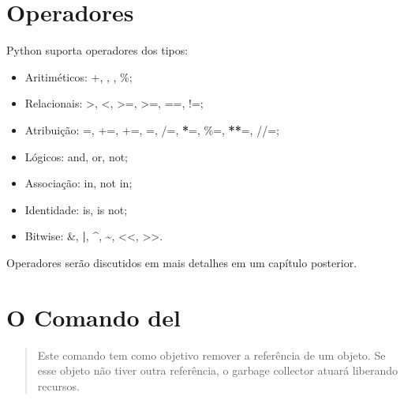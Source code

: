 \documentclass[letterpaper,10pt,brazil]{sphinxmanual}
\begin{document}
\section{Operadores}
\label{\detokenize{content/language_particularities:operadores}}
Python suporta operadores dos tipos:
\begin{itemize}
\item {} 
Aritiméticos: +, \sphinxhyphen{}, \sphinxstyleemphasis{, /, //, *}, \%;

\item {} 
Relacionais: \textgreater{}, \textless{}, \textgreater{}=, \textgreater{}=, ==, !=;

\item {} 
Atribuição: =, +=, +=, \sphinxhyphen{}=, /=, {\color{red}\bfseries{}*}=, \%=, {\color{red}\bfseries{}**}=, //=;

\item {} 
Lógicos: and, or, not;

\item {} 
Associação: in, not in;

\item {} 
Identidade: is, is not;

\item {} 
Bitwise: \&, {\color{red}\bfseries{}|}, \textasciicircum{}, \textasciitilde{}, \textless{}\textless{}, \textgreater{}\textgreater{}.

\end{itemize}

Operadores serão discutidos em mais detalhes em um capítulo posterior.


\section{O Comando del}
\label{\detokenize{content/language_particularities:o-comando-del}}\begin{quote}

Este comando tem como objetivo remover a referência de um objeto.
Se esse objeto não tiver outra referência, o garbage collector atuará liberando recursos.
\end{quote}

\begin{sphinxVerbatim}[commandchars=\\\{\}]
  
\end{sphinxVerbatim}
\end{document}

